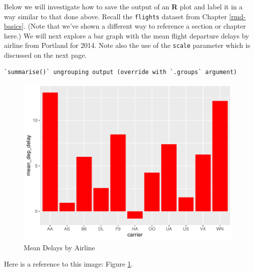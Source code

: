 \documentclass [11pt, proquest] {uwthesis}[2015/03/03]
\newenvironment{Shaded}{\begin{snugshade}}{\end{snugshade}}
\newcommand{\KeywordTok}[1]{\textcolor[rgb]{0.13,0.29,0.53}{\textbf{#1}}}
\newcommand{\DataTypeTok}[1]{\textcolor[rgb]{0.13,0.29,0.53}{#1}}
\newcommand{\StringTok}[1]{\textcolor[rgb]{0.31,0.60,0.02}{#1}}
\newcommand{\OperatorTok}[1]{\textcolor[rgb]{0.81,0.36,0.00}{\textbf{#1}}}
\newcommand{\NormalTok}[1]{#1}
\begin{document}
\clearpage 

Below we will investigate how to save the output of an \textbf{R} plot
and label it in a way similar to that done above. Recall the
\texttt{flights} dataset from Chapter \ref{rmd-basics}. (Note that we've
shown a different way to reference a section or chapter here.) We will
next explore a bar graph with the mean flight departure delays by
airline from Portland for 2014. Note also the use of the \texttt{scale}
parameter which is discussed on the next page.
\begin{Shaded}
\end{Shaded}
\begin{verbatim}
`summarise()` ungrouping output (override with `.groups` argument)
\end{verbatim}
\begin{figure}
\centering
\includegraphics{thesis_files/figure-latex/delaysboxplot-1.pdf}
\caption{\label{fig:delaysboxplot}Mean Delays by Airline}
\end{figure}
Here is a reference to this image: Figure \ref{fig:delaysboxplot}.
\end{document}
